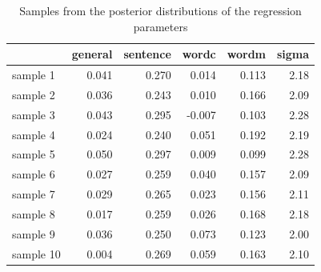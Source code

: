 \documentclass[11pt,a4paper,twoside]{book}\usepackage[]{graphicx}\usepackage[]{color}
\newenvironment{knitrout}{}{} %
\begin{document}
\begin{knitrout}
\color{fgcolor}\begin{table}

\caption{\label{tab:empirical.data.postsample2}Samples from the posterior distributions of the regression parameters}
\centering
\begin{tabular}[t]{lrrrrr}
\toprule
  & general & sentence & wordc & wordm & sigma\\
\midrule
sample 1 & 0.041 & 0.270 & 0.014 & 0.113 & 2.18\\
sample 2 & 0.036 & 0.243 & 0.010 & 0.166 & 2.09\\
sample 3 & 0.043 & 0.295 & -0.007 & 0.103 & 2.28\\
sample 4 & 0.024 & 0.240 & 0.051 & 0.192 & 2.19\\
sample 5 & 0.050 & 0.297 & 0.009 & 0.099 & 2.28\\
sample 6 & 0.027 & 0.259 & 0.040 & 0.157 & 2.09\\
sample 7 & 0.029 & 0.265 & 0.023 & 0.156 & 2.11\\
sample 8 & 0.017 & 0.259 & 0.026 & 0.168 & 2.18\\
sample 9 & 0.036 & 0.250 & 0.073 & 0.123 & 2.00\\
sample 10 & 0.004 & 0.269 & 0.059 & 0.163 & 2.10\\
\bottomrule
\end{tabular}
\end{table}


\end{knitrout}
\end{document}
